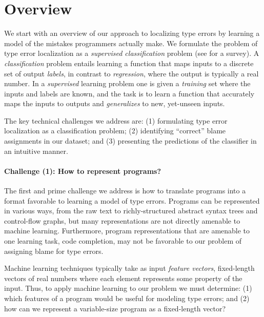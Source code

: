 \section{Overview}
\label{sec:overview}

We start with an overview of our approach to localizing type errors by
learning a model of the mistakes programmers actually make.
%
We formulate the problem of type error localization as a
\emph{supervised classification} problem (see \citealt{Kotsiantis2007-pj}
for a survey).
%
A \emph{classification} problem entails learning a function that maps
inputs to a discrete set of output \emph{labels}, in contrast to
\emph{regression}, where the output is typically a real number.
%
In a \emph{supervised} learning problem one is given a \emph{training}
set where the inputs and labels are known, and the task is to learn a
function that accurately maps the inputs to outputs and
\emph{generalizes} to new, yet-unseen inputs.

The key technical challenges we address are:
%
(1) formulating type error localization as a classification problem;
%
(2) identifying ``correct'' blame assignments in our dataset; and
%
(3) presenting the predictions of the classifier in an intuitive manner.

\paragraph{\textbf{Challenge (1): How to represent programs?}}
The first and prime challenge we address is how to translate programs
into a format favorable to learning a model of type errors.
%
Programs can be represented in various ways, from the raw text to 
richly-structured abstract syntax trees and control-flow graphs, but 
many representations are not directly amenable to machine learning.
%
Furthermore, program representations that are amenable to one learning
task, \eg code completion, may not be favorable to our problem of
assigning blame for type errors.

Machine learning techniques typically take as input \emph{feature
vectors}, fixed-length vectors of real numbers where each element
represents some property of the input.
%
Thus, to apply machine learning to our problem we must
determine:
%
(1) which features of a program would be useful for modeling type errors; and
%
(2) how can we represent a variable-size program as a fixed-length vector?

